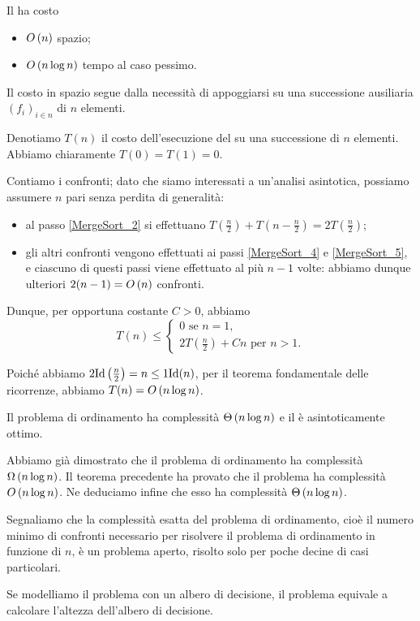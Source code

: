 \EndProof
\begin{Theorem}
	Il  ha costo
	\begin{itemize}
		\item $O \left ( n \right )$ spazio;
		\item $O \left ( n \log n \right )$ tempo al caso pessimo.
	\end{itemize}
\end{Theorem}
\Proof Il costo in spazio segue dalla necessit\`a di appoggiarsi su una
successione ausiliaria $(f_i)_{i \in n}$ di $n$ elementi.
\par Denotiamo $T(n)$ il costo dell'esecuzione del  su
una successione di $n$ elementi. Abbiamo chiaramente $T(0) = T(1) = 0$.
\par Contiamo i confronti; dato che siamo interessati a un'analisi
asintotica, possiamo assumere $n$ pari senza perdita di generalit\`a:
\begin{itemize}
  \item al passo \ref{MergeSort_2} si effettuano
    $T \left ( \frac{n}{2} \right )
      + T \left ( n - \frac{n}{2} \right )
      = 2 T \left ( \frac{n}{2} \right )$;
  \item gli altri confronti vengono effettuati ai passi
    \ref{MergeSort_4} e \ref{MergeSort_5}, e ciascuno di questi
    passi viene effettuato al pi\`u $n - 1$ volte: abbiamo dunque
    ulteriori $2(n - 1) = O \left ( n \right )$ confronti.
\end{itemize}
\par Dunque, per opportuna costante $C > 0$, abbiamo
\[
	T(n) \leq
	\begin{cases}
		0\text{ se }n = 1,\\
		2 T \left (\frac{n}{2} \right ) + C n\text{ per } n > 1.
	\end{cases}
\]
\par Poich\'e abbiamo
$2 \Identity \left ( \frac{n}{2} \right ) = n \leq 1 \Identity(n)$,
per il teorema fondamentale delle ricorrenze, abbiamo
$T(n) = O \left ( n \log n \right )$. \EndProof
\begin{Corollary}
  \label{AlgoritmiEStruttureDiDati_ComplessitaOrdinamento}
	Il problema di ordinamento ha complessit\`a $\Theta \left ( n \log n \right )$ e il
   \`e asintoticamente ottimo.
\end{Corollary}
\Proof Abbiamo gi\`a dimostrato che il problema di ordinamento ha complessit\`a
$\Omega \left ( n \log n \right )$.
Il teorema precedente ha provato che il problema ha complessit\`a
$O \left ( n \log n \right )$.
Ne deduciamo infine che esso ha complessit\`a $\Theta \left ( n \log n \right )$. \EndProof
\par Segnaliamo che la complessit\`a esatta del problema di ordinamento, cio\`e
il numero minimo di confronti necessario per risolvere il problema di
ordinamento in funzione di $n$, \`e un problema aperto, risolto solo per poche
decine di casi particolari.
\par Se modelliamo il problema con un albero di decisione, il problema equivale
a calcolare l'altezza dell'albero di decisione.
